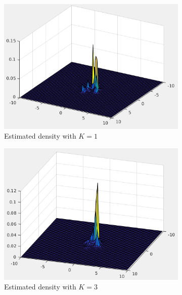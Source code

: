 \documentclass[12pt]{article}
\begin{document}
\begin{itemize}
\begin{figure}
\centering
\begin{subfigure}{0.45\textwidth}
\centering
\includegraphics[scale=0.35]{Imgs/5-17.png}
\caption{Estimated density with $K = 1$}
\end{subfigure}
\begin{subfigure}{0.45\textwidth}
\centering
\includegraphics[scale=0.35]{Imgs/5-18.png}
\caption{Estimated density with $K = 3$}
\end{subfigure}
\begin{subfigure}{0.45\textwidth}
\centering

\end{subfigure}
\end{figure}
\end{itemize}
\end{document}

